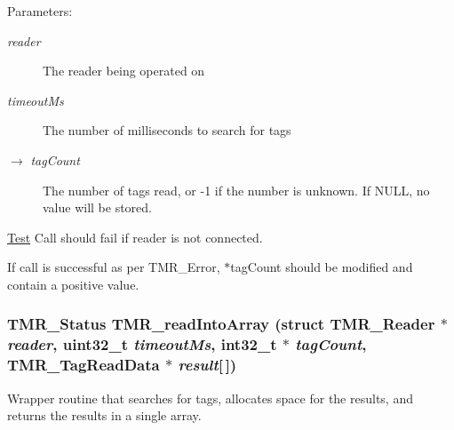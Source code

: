 \begin{Desc}
\item[Parameters:]
\begin{description}
\item[{\em reader}]The reader being operated on \item[{\em timeoutMs}]The number of milliseconds to search for tags \item[\mbox{$\rightarrow$} {\em tagCount}]The number of tags read, or -1 if the number is unknown. If NULL, no value will be stored.\end{description}
\end{Desc}
\begin{Desc}
\item[\hyperlink{test__test000005}{Test}]Call should fail if reader is not connected. 

If call is successful as per TMR\_\-Error, $\ast$tagCount should be modified and contain a positive value. \end{Desc}
\hypertarget{group__reader_gcc9391a834e069adc7dca9e910f45c06}{
\subsubsection[{TMR\_\-readIntoArray}]{\setlength{\rightskip}{0pt plus 5cm}TMR\_\-Status TMR\_\-readIntoArray (struct {\bf TMR\_\-Reader} $\ast$ {\em reader}, \/  uint32\_\-t {\em timeoutMs}, \/  int32\_\-t $\ast$ {\em tagCount}, \/  {\bf TMR\_\-TagReadData} $\ast$ {\em result}\mbox{[}$\,$\mbox{]})}}
\label{group__reader_gcc9391a834e069adc7dca9e910f45c06}


Wrapper routine that searches for tags, allocates space for the results, and returns the results in a single array.

